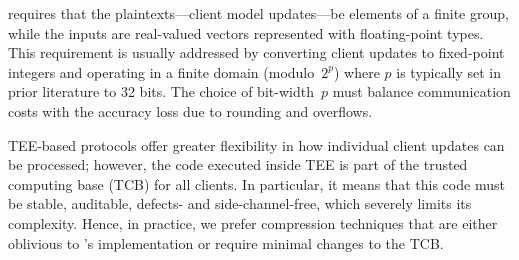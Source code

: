 \SecAgg requires that the plaintexts---client model updates---be elements of a finite group, while the inputs are real-valued vectors represented with floating-point types. 
This requirement is usually addressed by converting client updates to fixed-point integers and operating in a finite domain (modulo~$2^p$) where $p$ is typically set in prior literature to 32 bits. The choice of \SecAgg bit-width~$p$ must balance communication costs with the accuracy loss due to rounding and overflows.

TEE-based protocols offer greater flexibility in how individual client updates can be processed; however, the code executed inside TEE is part of the trusted computing base (TCB) for all clients. In particular, it means that this code must be stable, auditable, defects- and side-channel-free, which severely limits its complexity. Hence, in practice, we prefer compression techniques that are either oblivious to \SecAgg's implementation or require minimal changes to the TCB.



